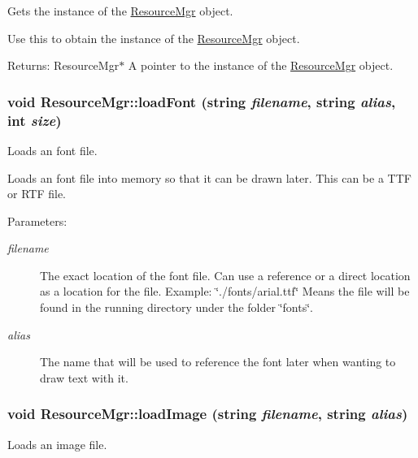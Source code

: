 Gets the instance of the \hyperlink{class_resource_mgr}{ResourceMgr} object. 

Use this to obtain the instance of the \hyperlink{class_resource_mgr}{ResourceMgr} object. \begin{Desc}
\item[Returns:]ResourceMgr$\ast$ A pointer to the instance of the \hyperlink{class_resource_mgr}{ResourceMgr} object. \end{Desc}
\hypertarget{class_resource_mgr_58fc2207c264aa0bd958c4e1a6fe3307}{
\subsubsection[{loadFont}]{\setlength{\rightskip}{0pt plus 5cm}void ResourceMgr::loadFont (string {\em filename}, \/  string {\em alias}, \/  int {\em size})}}
\label{class_resource_mgr_58fc2207c264aa0bd958c4e1a6fe3307}


Loads an font file. 

Loads an font file into memory so that it can be drawn later. This can be a TTF or RTF file. \begin{Desc}
\item[Parameters:]
\begin{description}
\item[{\em filename}]The exact location of the font file. Can use a reference or a direct location as a location for the file. Example: \char`\"{}./fonts/arial.ttf\char`\"{} Means the file will be found in the running directory under the folder \char`\"{}fonts\char`\"{}. \item[{\em alias}]The name that will be used to reference the font later when wanting to draw text with it. \end{description}
\end{Desc}
\hypertarget{class_resource_mgr_c1db8b4941088c629ec264d6431ad68f}{
\subsubsection[{loadImage}]{\setlength{\rightskip}{0pt plus 5cm}void ResourceMgr::loadImage (string {\em filename}, \/  string {\em alias})}}
\label{class_resource_mgr_c1db8b4941088c629ec264d6431ad68f}


Loads an image file. 

